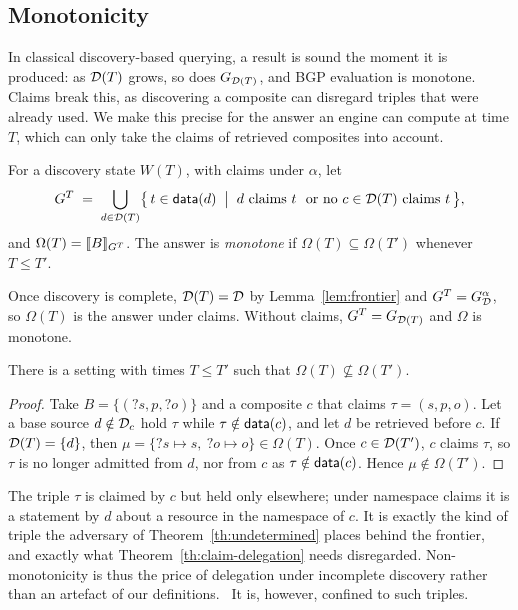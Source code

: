 

\subsection{Monotonicity}
\label{sec:monotonicity}

In classical discovery-based querying, a result is sound the moment it is produced: as
$\mathcal{D}(T)$ grows, so does $G_{\mathcal{D}(T)}$, and BGP evaluation is monotone. Claims break this,
as discovering a composite can disregard triples that were already used. We make this
precise for the answer an engine can compute at time $T$, which can only take the claims
of retrieved composites into account.

\begin{definition}
\label{def:answer-at-T}
For a discovery state $W(T)$, with claims under $\alpha$, let
\[
  G^{T} \;=\; \bigcup_{d \in \mathcal{D}(T)}
  \bigl\{\, t \in \mathsf{data}(d) \;\bigm|\; d \text{ claims } t
  \ \text{ or no } c \in \mathcal{D}(T) \text{ claims } t \,\bigr\},
\]
and $\Omega(T) = \llbracket B \rrbracket_{G^{T}}$. The answer is \emph{monotone} if
$\Omega(T) \subseteq \Omega(T')$ whenever $T \leq T'$.
\end{definition}

Once discovery is complete, $\mathcal{D}(T) = \mathcal{D}$ by Lemma~\ref{lem:frontier} and
$G^{T} = G^{\alpha}_{\mathcal{D}}$, so $\Omega(T)$ is the answer under claims. Without claims,
$G^{T} = G_{\mathcal{D}(T)}$ and $\Omega$ is monotone.

\begin{proposition}
\label{prop:non-monotone}
There is a setting with times $T \leq T'$ such that $\Omega(T) \not\subseteq \Omega(T')$.
\end{proposition}

\begin{proof}
Take $B = \{(?s, p, ?o)\}$ and a composite $c$ that claims $\tau = (s, p, o)$. Let a
base source $d \notin \mathcal{D}_c$ hold $\tau$ while $\tau \notin \mathsf{data}(c)$, and let $d$ be
retrieved before $c$. If $\mathcal{D}(T) = \{d\}$, then
$\mu = \{?s \mapsto s,\ ?o \mapsto o\} \in \Omega(T)$. Once $c \in \mathcal{D}(T')$, $c$ claims
$\tau$, so $\tau$ is no longer admitted from $d$, nor from $c$ as $\tau \notin \mathsf{data}(c)$.
Hence $\mu \notin \Omega(T')$.
\end{proof}

The triple $\tau$ is claimed by $c$ but held only elsewhere; under namespace claims it is
a statement by $d$ about a resource in the namespace of $c$. It is exactly the kind of
triple the adversary of Theorem~\ref{th:undetermined} places behind
the frontier, and exactly what Theorem~\ref{th:claim-delegation} needs disregarded.
Non-monotonicity is thus the price of delegation under incomplete discovery rather than
an artefact of our definitions.~ It is, however,
confined to such triples.

